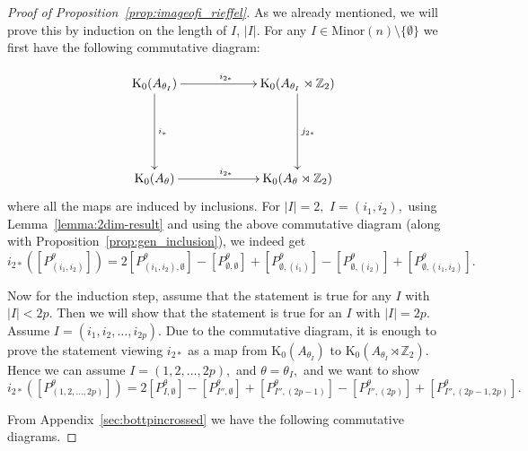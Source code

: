 \documentclass[9pt, BCOR=2mm]{amsart}
\numberwithin{equation}{section}
\numberwithin{equation}{section}
\newcommand{\Z}{{\mathbb{Z}}}
\newcommand{\K}{\mathrm{K}} %
\begin{document}
	\begin{proof}[Proof of Proposition~\ref{prop:imageofi_rieffel}]
	 As we already mentioned, we will prove this by induction on the length of $I$, $|I|.$ For any $I\in \mathrm{Minor}(n)\setminus \{\emptyset\}$ we first have the following commutative diagram:	
	 
	 \begin{align*}
\xymatrixrowsep{5pc}
\xymatrixcolsep{5pc}
\xymatrix
{
\K_0(A_{\theta_I}) \ar[r]^{i_{2*}} \ar[d]^{i_*} &
\K_0(A_{\theta_I}\rtimes\Z_2) \ar[d]^{j_{2*}} \\
\K_0(A_{\theta})\ar[r]^{i_{2*}} & \K_0(A_{\theta}\rtimes\Z_2)
}
\end{align*}
where all the maps are induced by inclusions.
For $|I|=2,$ $I=(i_1,i_2),$ using Lemma~\ref{lemma:2dim-result} and using the above commutative diagram (along with Proposition~\ref{prop:gen_inclusion}), we indeed get 
$$i_{2*}([P_{(i_1,i_2)}^{\theta}])=	2[P_{(i_1,i_2),\emptyset} ^{\theta}]-[P_{\emptyset,\emptyset} ^{\theta}]+[P_{\emptyset,(i_1)} ^{\theta}]-[P_{\emptyset, (i_2)} ^{\theta}]+[P_{\emptyset, (i_1,i_2)} ^{\theta}].$$

Now for the induction step, assume that the statement is true for any $I$ with $|I|< 2p$. Then we will show that the statement is true for an $I$ with $|I|= 2p.$ Assume $I=(i_1,i_2,\dots,i_{2p}).$ Due to the commutative diagram, it is enough to prove the statement viewing $i_{2*}$ as a map from $\K_0(A_{\theta_I})$ to $\K_0(A_{\theta_I}\rtimes\Z_2).$ Hence we can assume $I= (1,2,\dots,2p),$ and $\theta= \theta_I,$ and we want to show 
$$i_{2*}([P_{(1,2,\dots,2p)}^{\theta}])=	2[P_{I,\emptyset} ^{\theta}]-[P_{I'',\emptyset} ^{\theta}]+[P_{I'',({2p-1})} ^{\theta}]-[P_{I'', ({2p})} ^{\theta}]+[P_{I'', ({2p-1},{2p})} ^{\theta}].$$


From Appendix~\ref{sec:bottpincrossed} we have the following commutative diagrams. 


\end{proof}
\end{document}
